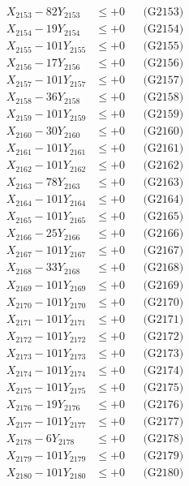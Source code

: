 \documentclass[a4paper,10pt]{article}
\begin{document}
{\begin{align}
X_{2153} - 82Y_{2153} &\leq +0 && \text{(G2153)} \\
X_{2154} - 19Y_{2154} &\leq +0 && \text{(G2154)} \\
X_{2155} - 101Y_{2155} &\leq +0 && \text{(G2155)} \\
X_{2156} - 17Y_{2156} &\leq +0 && \text{(G2156)} \\
X_{2157} - 101Y_{2157} &\leq +0 && \text{(G2157)} \\
X_{2158} - 36Y_{2158} &\leq +0 && \text{(G2158)} \\
X_{2159} - 101Y_{2159} &\leq +0 && \text{(G2159)} \\
X_{2160} - 30Y_{2160} &\leq +0 && \text{(G2160)} \\
\allowbreak
X_{2161} - 101Y_{2161} &\leq +0 && \text{(G2161)} \\
X_{2162} - 101Y_{2162} &\leq +0 && \text{(G2162)} \\
X_{2163} - 78Y_{2163} &\leq +0 && \text{(G2163)} \\
X_{2164} - 101Y_{2164} &\leq +0 && \text{(G2164)} \\
X_{2165} - 101Y_{2165} &\leq +0 && \text{(G2165)} \\
X_{2166} - 25Y_{2166} &\leq +0 && \text{(G2166)} \\
X_{2167} - 101Y_{2167} &\leq +0 && \text{(G2167)} \\
X_{2168} - 33Y_{2168} &\leq +0 && \text{(G2168)} \\
X_{2169} - 101Y_{2169} &\leq +0 && \text{(G2169)} \\
X_{2170} - 101Y_{2170} &\leq +0 && \text{(G2170)} \\
\allowbreak
X_{2171} - 101Y_{2171} &\leq +0 && \text{(G2171)} \\
X_{2172} - 101Y_{2172} &\leq +0 && \text{(G2172)} \\
X_{2173} - 101Y_{2173} &\leq +0 && \text{(G2173)} \\
X_{2174} - 101Y_{2174} &\leq +0 && \text{(G2174)} \\
X_{2175} - 101Y_{2175} &\leq +0 && \text{(G2175)} \\
X_{2176} - 19Y_{2176} &\leq +0 && \text{(G2176)} \\
X_{2177} - 101Y_{2177} &\leq +0 && \text{(G2177)} \\
X_{2178} - 6Y_{2178} &\leq +0 && \text{(G2178)} \\
X_{2179} - 101Y_{2179} &\leq +0 && \text{(G2179)} \\
X_{2180} - 101Y_{2180} &\leq +0 && \text{(G2180)} \\

\end{align}}
\end{document}
